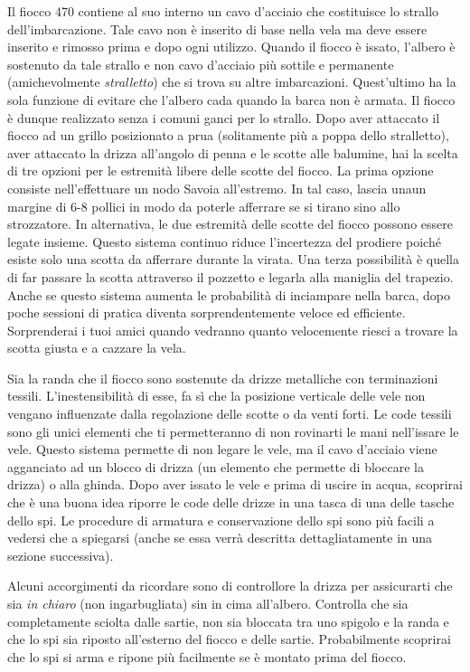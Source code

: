 Il fiocco 470 contiene al suo interno un cavo d'acciaio che costituisce lo
strallo dell'imbarcazione. Tale cavo non è inserito di base nella vela ma deve
essere inserito e rimosso prima e dopo ogni utilizzo. Quando il fiocco è issato,
l'albero è sostenuto da tale strallo e non cavo d'acciaio più sottile e
permanente (amichevolmente \emph{stralletto}) che si trova su altre
imbarcazioni. Quest'ultimo ha la sola funzione di evitare che l'albero cada
quando la barca non è armata. Il fiocco è dunque realizzato senza i comuni ganci
per lo strallo. Dopo aver attaccato il fiocco ad un grillo posizionato
a prua (solitamente più a poppa dello stralletto), aver attaccato la drizza
all'angolo di penna e le scotte alle balumine, hai la
scelta di tre opzioni per le estremità libere delle scotte del fiocco. La prima
opzione consiste nell'effettuare un nodo Savoia all'estremo. In tal caso, lascia
unaun margine di 6-8 pollici in modo da poterle afferrare se si
tirano sino allo strozzatore. In alternativa, le due estremità delle scotte del fiocco
possono essere legate insieme. Questo sistema continuo riduce l'incertezza del
prodiere poiché esiste solo una scotta da afferrare durante la virata. Una terza
possibilità è quella di far passare la scotta attraverso il pozzetto e legarla
alla maniglia del trapezio. Anche se questo sistema aumenta le probabilità
di inciampare nella barca, dopo poche sessioni di pratica diventa
sorprendentemente veloce ed efficiente. Sorprenderai i tuoi amici quando
vedranno quanto velocemente riesci a trovare la scotta giusta e a cazzare la
vela.

Sia la randa che il fiocco sono sostenute da drizze metalliche con terminazioni
tessili. L'inestensibilità di esse, fa sì che la posizione verticale delle vele
non vengano influenzate dalla
regolazione delle scotte o da venti forti. Le code tessili sono gli unici
elementi che ti permetteranno di non rovinarti le mani nell'issare le vele.
Questo sistema permette di non legare le vele, ma il cavo d'acciaio viene
agganciato ad un blocco di drizza (un elemento che permette di bloccare la
drizza) o alla ghinda. Dopo aver issato le vele e prima di uscire in acqua, scoprirai che è
una buona idea riporre le code delle drizze in una tasca di una delle tasche
dello spi. Le procedure di armatura e conservazione dello spi sono più facili a
vedersi che a spiegarsi (anche se essa verrà descritta dettagliatamente in una sezione successiva).

Alcuni accorgimenti da ricordare sono di controllore la drizza per assicurarti che sia
\emph{in chiaro} (non ingarbugliata) sin in cima all'albero. Controlla che sia completamente sciolta dalle sartie, non sia
bloccata tra uno spigolo e la randa e che lo spi sia riposto
all'esterno del fiocco e delle sartie. Probabilmente scoprirai che lo spi si
arma e ripone più facilmente se è montato prima del fiocco.

